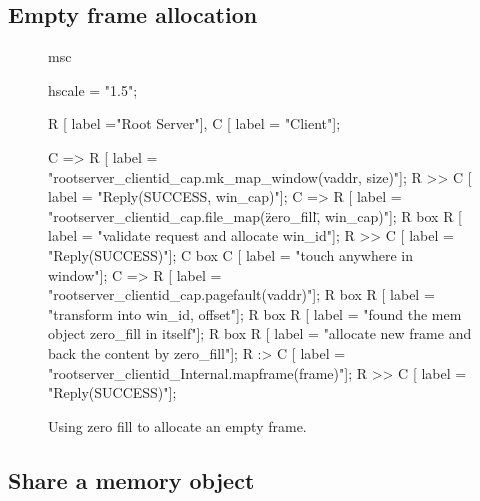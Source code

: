 %
%
%
%

\subsection{Empty frame allocation}

\begin{figure}[htb]
\begin{center}
\begin{msc}
msc {
    hscale = "1.5";

    R [ label ="Root Server"],
    C [ label = "Client"];
    
    C => R [ label = "rootserver\_clientid\_cap.mk\_map\_window(vaddr, size)"];
    R >> C [ label = "Reply(SUCCESS, win\_cap)"];
    C => R [ label = "rootserver\_clientid\_cap.file\_map(\"zero\_fill\", win\_cap)"];
    R box R [ label = "validate request and allocate win\_id"];
    R >> C [ label = "Reply(SUCCESS)"];
    C box C [ label = "touch anywhere in window"];
    C => R [ label = "rootserver\_clientid\_cap.pagefault(vaddr)"];
    R box R [ label = "transform into win\_id, offset"];
    R box R [ label = "found the mem object zero\_fill in itself"];
    R box R [ label = "allocate new frame and back the content by zero\_fill"];
    R :> C [ label = "rootserver\_clientid\_Internal.mapframe(frame)"];
    R >> C [ label = "Reply(SUCCESS)"];
}
\end{msc}
\end{center}
\caption{Using zero fill to allocate an empty frame.}
\end{figure}

\subsection{Share a memory object}

